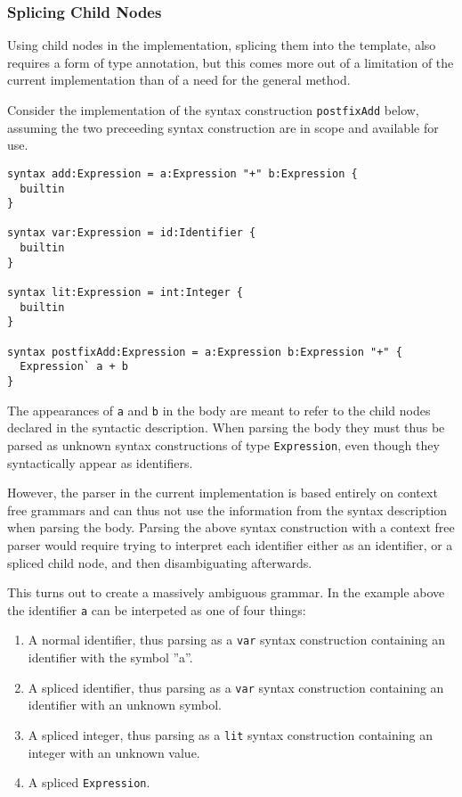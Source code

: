 \documentclass{kththesis}
\begin{document}
\subsubsection{Splicing Child Nodes}

Using child nodes in the implementation, splicing them into the template, also requires a form of type annotation, but this comes more out of a limitation of the current implementation than of a need for the general method.

Consider the implementation of the syntax construction \texttt{postfixAdd} below, assuming the two preceeding syntax construction are in scope and available for use.

\begin{verbatim}
syntax add:Expression = a:Expression "+" b:Expression {
  builtin
}

syntax var:Expression = id:Identifier {
  builtin
}

syntax lit:Expression = int:Integer {
  builtin
}

syntax postfixAdd:Expression = a:Expression b:Expression "+" {
  Expression` a + b
}
\end{verbatim}

The appearances of \texttt{a} and \texttt{b} in the body are meant to refer to the child nodes declared in the syntactic description. When parsing the body they must thus be parsed as unknown syntax constructions of type \texttt{Expression}, even though they syntactically appear as identifiers.

However, the parser in the current implementation is based entirely on context free grammars and can thus not use the information from the syntax description when parsing the body. Parsing the above syntax construction with a context free parser would require trying to interpret each identifier either as an identifier, or a spliced child node, and then disambiguating afterwards.

This turns out to create a massively ambiguous grammar. In the example above the identifier \texttt{a} can be interpeted as one of four things:
\begin{enumerate}
  \item A normal identifier, thus parsing as a \texttt{var} syntax construction containing an identifier with the symbol ''a''.
  \item A spliced identifier, thus parsing as a \texttt{var} syntax construction containing an identifier with an unknown symbol.
  \item A spliced integer, thus parsing as a \texttt{lit} syntax construction containing an integer with an unknown value.
  \item A spliced \texttt{Expression}.
\end{enumerate}
\end{document}
